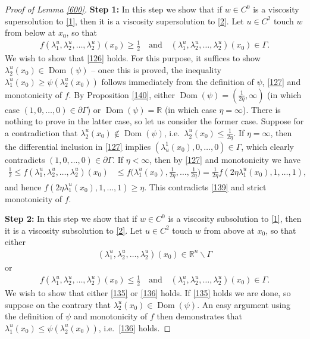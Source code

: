 \documentclass[12pt]{article}
\numberwithin{equation}{section}
\theoremstyle{plain}
\theoremstyle{definition}
\begin{document}
\begin{appendices}
\begin{proof}[Proof of Lemma \ref{600}]
	\textbf{Step 1:} In this step we show that if $w\in C^0$ is a viscosity supersolution to \eqref{1}, then it is a viscosity supersolution to \eqref{2}. Let $u\in C^2$ touch $w$ from below at $x_0$, so that 
	\begin{align}\label{127}
	f(\lambda_1^u,\lambda_2^u,\dots,\lambda_2^u)(x_0)\geq \frac{1}{2} \quad \text{and} \quad (\lambda_1^u,\lambda_2^u,\dots,\lambda_2^u)(x_0)\in\Gamma. 
	\end{align} 
	We wish to show that \eqref{126} holds. For this purpose, it suffices to show $\lambda_2^u(x_0)\in\operatorname{Dom}(\psi)$ -- once this is proved, the inequality $\lambda_1^u(x_0) \geq \psi(\lambda_2^u(x_0))$ follows immediately from the definition of $\psi$, \eqref{127} and monotonicity of $f$. By Proposition \ref{140}, either $\operatorname{Dom}(\psi) = (\frac{1}{2\eta},\infty)$ (in which case $(1,0,\dots,0)\in\partial\Gamma$) or $\operatorname{Dom}(\psi) = \mathbb{R}$ (in which case $\eta = \infty$). There is nothing to prove in the latter case, so let us consider the former case. Suppose for a contradiction that $\lambda_2^u(x_0)\not\in\operatorname{Dom}(\psi)$, i.e.~$\lambda_2^u(x_0) \leq \frac{1}{2\eta}$. If $\eta=\infty$, then the differential inclusion in \eqref{127} implies $(\lambda^1_u(x_0), 0, \dots,0)\in\Gamma$, which clearly contradicts $(1,0,\dots,0)\in\partial\Gamma$. If $\eta<\infty$, then by \eqref{127} and monotonicity we have
	\begin{align*}
	\frac{1}{2}\leq f(\lambda_1^u,\lambda_2^u,\dots,\lambda_2^u)(x_0) &  \leq f\bigg(\lambda_1^u(x_0), \frac{1}{2\eta}, \dots, \frac{1}{2\eta}\bigg) = \frac{1}{2\eta}f(2\eta\lambda_1^u(x_0),1,\dots,1),
	\end{align*}
	and hence $f(2\eta\lambda_1^u(x_0),1,\dots,1) \geq \eta$. This contradicts \eqref{139} and strict monotonicity of $f$.\medskip 
	
	

	
	\noindent\textbf{Step 2:} In this step we show that if $w\in C^0$ is a viscosity subsolution to \eqref{1}, then it is a viscosity subsolution to \eqref{2}. Let $u\in C^2$ touch $w$ from above at $x_0$, so that either 
	\begin{align*}
	(\lambda_1^u,\lambda_2^u,\dots,\lambda_2^u)(x_0)\in\mathbb{R}^n\backslash\Gamma
	\end{align*}
	or 
	\begin{align*}
	f(\lambda_1^u,\lambda_2^u,\dots,\lambda_2^u)(x_0)\leq \frac{1}{2} \quad \text{and} \quad (\lambda_1^u,\lambda_2^u,\dots,\lambda_2^u)(x_0)\in\Gamma. 
	\end{align*}
	We wish to show that either \eqref{135} or \eqref{136} holds. If \eqref{135} holds we are done, so suppose on the contrary that $\lambda_2^u(x_0)\in\operatorname{Dom}(\psi)$. An easy argument using the definition of $\psi$ and monotonicity of $f$ then demonstrates that $\lambda_1^u(x_0) \leq \psi(\lambda_2^u(x_0))$, i.e.~\eqref{136} holds. \medskip 
	

\end{proof}
\end{appendices}
\end{document}
